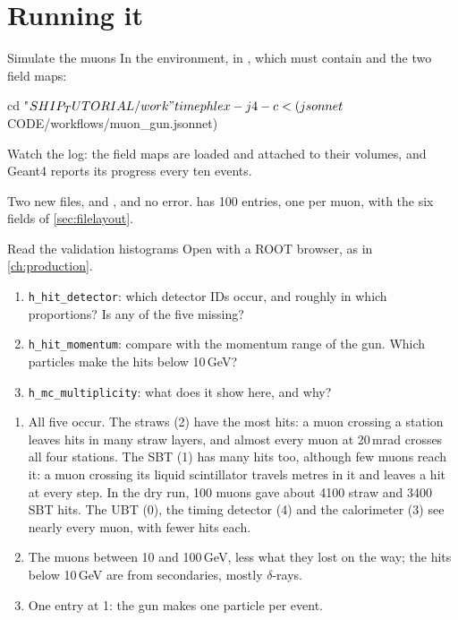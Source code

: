 \section{Running it}

\begin{exercise}{Simulate the muons}
\label{ex:muongun}
In the  environment, in , which must contain
 and the two field maps:
\begin{shell}
cd "$SHIP_TUTORIAL/work"
time phlex -j 4 -c <(jsonnet $CODE/workflows/muon_gun.jsonnet)
\end{shell}
Watch the log: the field maps are loaded and attached to their volumes, and
Geant4 reports its progress every ten events.
\end{exercise}

\begin{checkpoint}
Two new files,  and ,
and no error.  has 100 entries, one per muon, with the
six fields of \cref{sec:filelayout}.
\end{checkpoint}

\begin{exercise}{Read the validation histograms}
Open  with a ROOT browser, as in
\cref{ch:production}.
\begin{enumerate}
  \item \texttt{h\_hit\_detector}: which detector IDs occur, and roughly in
        which proportions? Is any of the five missing?
  \item \texttt{h\_hit\_momentum}: compare with the momentum range of the
        gun. Which particles make the hits below 10\,GeV?
  \item \texttt{h\_mc\_multiplicity}: what does it show here, and why?
\end{enumerate}
\end{exercise}

\begin{solution}
\begin{enumerate}
  \item All five occur. The straws (2) have the most hits: a muon crossing a
        station leaves hits in many straw layers, and almost every muon at
        20\,mrad crosses all four stations. The SBT (1) has many hits too, although
        few muons reach it: a muon crossing its liquid scintillator travels
        metres in it and leaves a hit at every step. In the dry run, 100 muons
        gave about 4100 straw and 3400 SBT hits. The UBT (0), the timing
        detector (4) and the calorimeter (3) see nearly every muon, with
        fewer hits each.
  \item The muons between 10 and 100\,GeV, less what they lost on the way;
        the hits below 10\,GeV are from secondaries, mostly $\delta$-rays.
  \item One entry at 1: the gun makes one particle per event.
\end{enumerate}
\end{solution}

